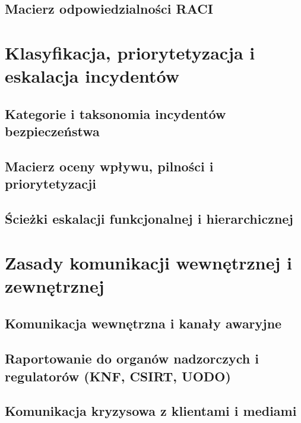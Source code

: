 \subsection{Macierz odpowiedzialności RACI}\label{subsec:macierz-raci}

\section{Klasyfikacja, priorytetyzacja i eskalacja incydentów}\label{sec:klasyfikacja-eskalacja}

\subsection{Kategorie i taksonomia incydentów bezpieczeństwa}\label{subsec:kategorie-incydentow}

\subsection{Macierz oceny wpływu, pilności i priorytetyzacji}\label{subsec:macierz-priorytetyzacji}

\subsection{Ścieżki eskalacji funkcjonalnej i hierarchicznej}\label{subsec:sciezki-eskalacji}

\section{Zasady komunikacji wewnętrznej i zewnętrznej}\label{sec:zasady-komunikacji}

\subsection{Komunikacja wewnętrzna i kanały awaryjne}\label{subsec:komunikacja-wewnetrzna}

\subsection{Raportowanie do organów nadzorczych i regulatorów (KNF, CSIRT, UODO)}\label{subsec:raportowanie-regulatorzy}

\subsection{Komunikacja kryzysowa z klientami i mediami}\label{subsec:komunikacja-klienci}
